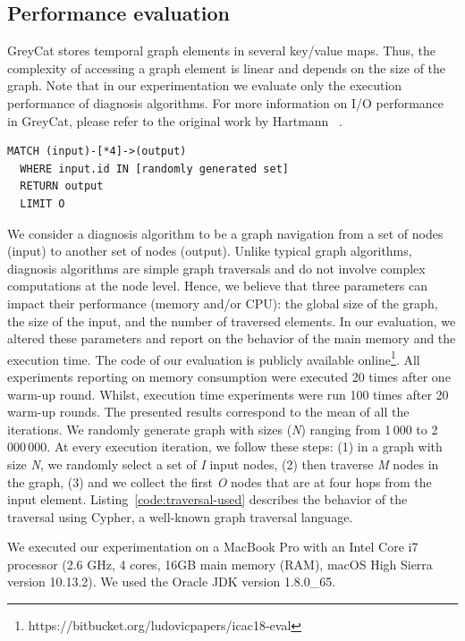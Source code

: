 \subsection{Performance evaluation}
GreyCat stores temporal graph elements in several key/value maps. Thus, the complexity of accessing a graph element is linear and depends on the size of the graph. 
Note that in our experimentation we evaluate only the execution performance of diagnosis algorithms. For more information on I/O performance in GreyCat, please refer to the original work by Hartmann \etal~\cite{DBLP:conf/seke/0001FJRT17, DBLP:phd/basesearch/Hartmann16}.

\begin{lstlisting}[style=customc,caption=Traversal used during the experimentations,label=code:traversal-used,basicstyle=\scriptsize]
  MATCH (input)-[*4]->(output)
  WHERE input.id IN [randomly generated set]
  RETURN output
  LIMIT O
\end{lstlisting}

We consider a diagnosis algorithm to be a graph navigation from a set of nodes (input) to another set of nodes (output).
Unlike typical graph algorithms, diagnosis algorithms are simple graph traversals and do not involve complex computations at the node level. Hence, we believe that three parameters can impact their performance (memory and/or CPU): the global size of the graph, the size of the input, and the number of traversed elements.
In our evaluation, we altered these parameters and report on the behavior of the main memory and the execution time. The code of our evaluation is publicly available online\footnote{https://bitbucket.org/ludovicpapers/icac18-eval}.
All experiments reporting on memory consumption were executed 20 times after one warm-up round. Whilst, execution time experiments were run 100 times after 20 warm-up rounds.
The presented results correspond to the mean of all the iterations.
We randomly generate graph with sizes (\textit{N}) ranging from 1\,000 to 2\,000\,000. 
At every execution iteration, we follow these steps: (1) in a graph with size \textit{N}, we randomly select a set of \textit{I} input nodes, (2) then traverse \textit{M} nodes in the graph, (3) and  we collect  the first \textit{O} nodes that are at four hops from the input element. Listing~\ref{code:traversal-used} describes the behavior of the traversal using Cypher, a well-known graph traversal language.

We executed our experimentation on a MacBook Pro with an Intel Core i7 processor (2.6 GHz, 4 cores, 16GB main memory (RAM), macOS High Sierra version 10.13.2). We used the Oracle JDK version 1.8.0\_65.

